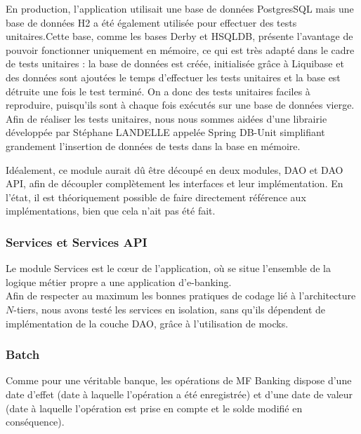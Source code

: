 En production, l'application utilisait une base de données PostgresSQL mais une base de données H2 a été également utilisée pour effectuer des tests unitaires.Cette base, comme les bases Derby et HSQLDB, présente l'avantage de pouvoir fonctionner uniquement en mémoire, ce qui est très adapté dans le cadre de tests unitaires : la base de données est créée, initialisée grâce à Liquibase et des données sont ajoutées le temps d'effectuer les tests unitaires et la base est détruite une fois le test terminé. On a donc des tests unitaires faciles à reproduire, puisqu'ils sont à chaque fois exécutés sur une base de données vierge.\\

Afin de réaliser les tests unitaires, nous nous sommes aidées d'une librairie développée par Stéphane LANDELLE appelée Spring DB-Unit simplifiant grandement l'insertion de données de tests dans la base en mémoire. 

Idéalement, ce module aurait dû être découpé en deux modules, DAO et DAO API, afin de découpler complètement les interfaces et leur implémentation. En l'état, il est théoriquement possible de faire directement référence aux implémentations, bien que cela n'ait pas été fait.\\
 
\subsubsection*{Services et Services API}

Le module Services est le cœur de l'application, où se situe l'ensemble de la logique métier propre a une application d'e-banking.\\

Afin de respecter au maximum les bonnes pratiques de codage lié à l'architecture $N$-tiers, nous avons testé les services en isolation, sans qu'ils dépendent de implémentation de la couche DAO, grâce à l'utilisation de mocks.\\

\subsubsection*{Batch}

Comme pour une véritable banque, les opérations de MF Banking dispose d'une date d'effet (date à laquelle l'opération a été enregistrée) et d'une date de valeur (date à laquelle l'opération est prise en compte et le solde modifié en conséquence).\\

